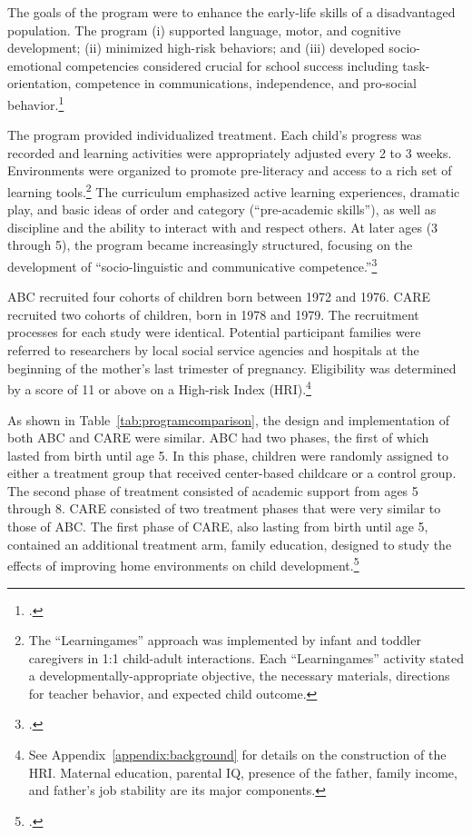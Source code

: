 The goals of the program were to enhance the early-life skills of a disadvantaged population. The program (i) supported language, motor, and cognitive development; (ii) minimized high-risk behaviors; and (iii) developed socio-emotional competencies considered crucial for school success including task-orientation, competence in communications, independence, and pro-social behavior.\footnote{\citet{Ramey_Collier_etal_1976_CarolinaAbecedarianProject, Ramey_etal_1985_Project-CARE_TiECSE, Sparling_1974_Synth_Edu_Infant_SPEECH, Wasik_Ramey_etal_1990_CD, Ramey-etal_2012-ABC}.}

The program provided individualized treatment. Each child's progress was recorded and learning activities were appropriately adjusted every 2 to 3 weeks. Environments were organized to promote pre-literacy and access to a rich set of learning tools.\footnote{The ``Learningames'' approach was implemented by infant and toddler caregivers in 1:1 child-adult interactions. Each ``Learningames'' activity stated a developmentally-appropriate objective, the necessary materials, directions for teacher behavior, and expected child outcome.} The curriculum emphasized active learning experiences, dramatic play, and basic ideas of order and category (``pre-academic skills''), as well as discipline and the ability to interact with and respect others.  At later ages (3 through 5), the program became increasingly structured, focusing on the development of ``socio-linguistic and communicative competence.''\footnote{\citet{Ramey-et-al_1977_Intro-to-ABC, Haskins_1985_CD, Ramey_1981_Modification, Ramey_Campbell_1979_SR, Ramey_Smith_1977_AJMD, Ramey_McGinness_etal_1982_Abecedarianapproach, Sparling_Lewis_1979_BOOKLearninggamesFirstThree,Sparling_Lewis_1984_BOOKLearningGamesThreesFours}.}

ABC recruited four cohorts of children born between 1972 and 1976. CARE recruited two cohorts of children, born in 1978 and 1979. The recruitment processes for each study were identical. Potential participant families were referred to researchers by local social service agencies and hospitals at the beginning of the mother's last trimester of pregnancy. Eligibility was determined by a score of 11 or above on a High-risk Index (HRI).\footnote{See Appendix~\ref{appendix:background} for details on the construction of the HRI. Maternal education, parental IQ, presence of the father, family income, and father's job stability are its major components.}

As shown in Table~\ref{tab:programcomparison}, the design and implementation of both ABC and CARE were similar. ABC had two phases, the first of which lasted from birth until age 5. In this phase, children were randomly assigned to either a treatment group that received center-based childcare or a control group. The second phase of treatment consisted of academic support from ages 5 through 8. CARE consisted of two treatment phases that were very similar to those of ABC. The first phase of CARE, also lasting from birth until age 5, contained an additional treatment arm, family education, designed to study the effects of improving home environments on child development.\footnote{\citet{Wasik_Ramey_etal_1990_CD}.}

